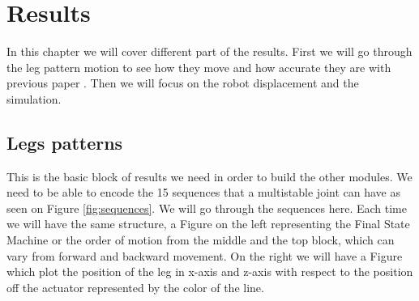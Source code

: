 \chapter{Results}
    In this chapter we will cover different part of the results. First we will go through the leg pattern motion to see how they move and how accurate they are with previous paper \cite{mo_main_paper}. Then we will focus on the robot displacement and the simulation. 
    \section{Legs patterns}\label{sec:res_legs}
        This is the basic block of results we need in order to build the other modules. We need to be able to encode the 15 sequences that a multistable joint can have as seen on Figure \ref{fig:sequences}. We will go through the sequences here. Each time we will have the same structure, a Figure on the left representing the Final State Machine or the order of motion from the middle and the top block, which can vary from forward and backward movement. On the right we will have a Figure which plot the position of the leg in x-axis and z-axis with respect to the position off the actuator represented by the color of the line.

